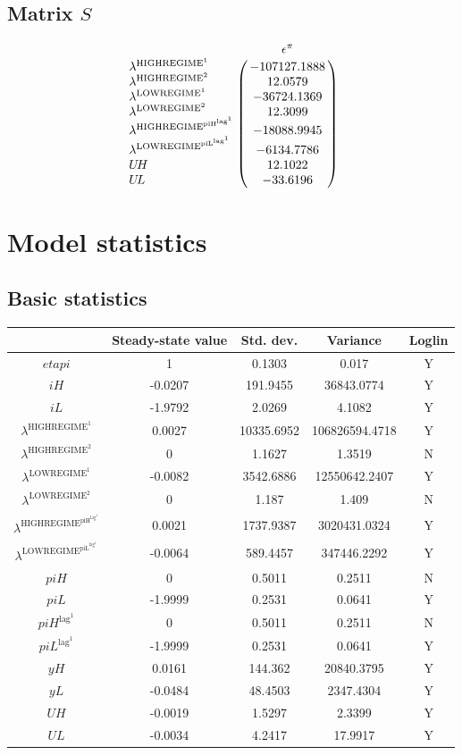 \subsection*{Matrix $S$}

$$\bordermatrix{
~ & \epsilon^{\pi} \cr
\lambda^{\mathrm{HIGHREGIME}^{\mathrm{1}}} & -107127.1888 \cr
\lambda^{\mathrm{HIGHREGIME}^{\mathrm{2}}} & 12.0579 \cr
\lambda^{\mathrm{LOWREGIME}^{\mathrm{1}}} & -36724.1369 \cr
\lambda^{\mathrm{LOWREGIME}^{\mathrm{2}}} & 12.3099 \cr
\lambda^{\mathrm{HIGHREGIME}^{\mathrm{piH}^{\mathrm{lag}^{\mathrm{1}}}}} & -18088.9945 \cr
\lambda^{\mathrm{LOWREGIME}^{\mathrm{piL}^{\mathrm{lag}^{\mathrm{1}}}}} & -6134.7786 \cr
{U\!H} & 12.1022 \cr
{U\!L} & -33.6196 \cr
}$$


\section{Model statistics}

\subsection{Basic statistics}

\begin{tabular}{c|c|c|c|c|}
  & Steady-state value & Std. dev. & Variance & Loglin\\
\hline
${e\!t\!a\!p\!i}$ & 1 & 0.1303 & 0.017 & Y    \\
${i\!H}$ & -0.0207 & 191.9455 & 36843.0774 & Y    \\
${i\!L}$ & -1.9792 & 2.0269 & 4.1082 & Y    \\
$\lambda^{\mathrm{HIGHREGIME}^{\mathrm{1}}}$ & 0.0027 & 10335.6952 & 106826594.4718 & Y    \\
$\lambda^{\mathrm{HIGHREGIME}^{\mathrm{2}}}$ & 0 & 1.1627 & 1.3519 & N    \\
$\lambda^{\mathrm{LOWREGIME}^{\mathrm{1}}}$ & -0.0082 & 3542.6886 & 12550642.2407 & Y    \\
$\lambda^{\mathrm{LOWREGIME}^{\mathrm{2}}}$ & 0 & 1.187 & 1.409 & N    \\
$\lambda^{\mathrm{HIGHREGIME}^{\mathrm{piH}^{\mathrm{lag}^{\mathrm{1}}}}}$ & 0.0021 & 1737.9387 & 3020431.0324 & Y    \\
$\lambda^{\mathrm{LOWREGIME}^{\mathrm{piL}^{\mathrm{lag}^{\mathrm{1}}}}}$ & -0.0064 & 589.4457 & 347446.2292 & Y    \\
${p\!i\!H}$ & 0 & 0.5011 & 0.2511 & N    \\
${p\!i\!L}$ & -1.9999 & 0.2531 & 0.0641 & Y    \\
${p\!i\!H}^{\mathrm{lag}^{\mathrm{1}}}$ & 0 & 0.5011 & 0.2511 & N    \\
${p\!i\!L}^{\mathrm{lag}^{\mathrm{1}}}$ & -1.9999 & 0.2531 & 0.0641 & Y    \\
${y\!H}$ & 0.0161 & 144.362 & 20840.3795 & Y    \\
${y\!L}$ & -0.0484 & 48.4503 & 2347.4304 & Y    \\
${U\!H}$ & -0.0019 & 1.5297 & 2.3399 & Y    \\
${U\!L}$ & -0.0034 & 4.2417 & 17.9917 & Y    \\
\hline
\end{tabular}


